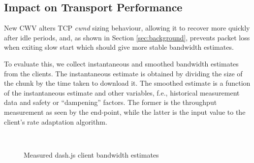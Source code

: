\documentclass[10pt,sigconf]{acmart}
\begin{document}
\subsection{Impact on Transport Performance} 
\label{sec:transport-impact}

New CWV alters TCP \emph{cwnd} sizing behaviour, allowing it to recover more quickly after idle periods, and, as shown in Section \ref{sec:background}, prevents packet loss when exiting slow start which should give more stable bandwidth estimates. 

To evaluate this, we collect instantaneous and smoothed bandwidth estimates from the clients. The instantaneous estimate is obtained by dividing the size of the chunk by the time taken to download it. The smoothed estimate is a function of the instantaneous estimate and other variables, f.e., historical measurement data and safety or ``dampening'' factors. The former is the throughput measurement as seen by the end-point, while the latter is the input value to the client's rate adaptation algorithm.

\begin{figure}[t!]
  \centering
  \\
  \caption{Measured dash.js client bandwidth estimates}
  \label{fig:throughput-clients}
\end{figure}
\end{document}
